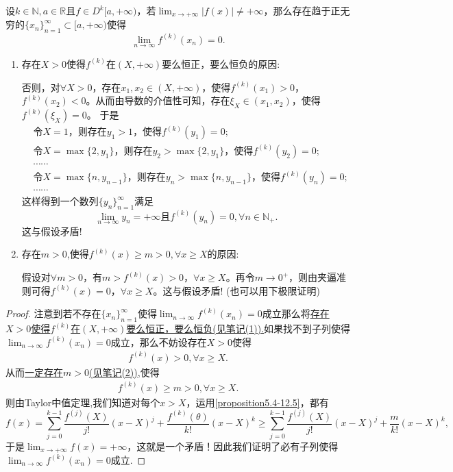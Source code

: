 \documentclass[lang=cn,newtx,10pt,scheme=chinese]{elegantbook}
\begin{document}
\begin{proposition}\label{proposition:函数不爆破则各阶导数必然有趋于 0 的子列}
设\(k\in\mathbb{N},a\in\mathbb{R}\)且\(f\in D^{k}[a,+\infty)\)，若\(\lim_{x\rightarrow +\infty}|f(x)|\neq +\infty\)，那么存在趋于正无穷的\(\{x_n\}_{n = 1}^{\infty}\subset [a,+\infty)\)使得
\[
\lim_{n\rightarrow\infty}f^{(k)}(x_n)=0.
\]
\end{proposition}
\begin{note}
\begin{enumerate}[(1)]
\item \hypertarget{proposition5.4由假设得到这个结论的原因}{存在\(X > 0\)使得\(f^{(k)}\)在\((X,+\infty)\)要么恒正，要么恒负的原因:}否则，对\(\forall X>0\)，存在\(x_1,x_2\in (X,+\infty)\)，使得\(f^{(k)}(x_1)>0\)，\(f^{(k)}(x_2)<0\)。从而由导数的介值性可知，存在\(\xi_X\in (x_1,x_2)\)，使得\(f^{(k)}(\xi_X) = 0\)。
于是
\begin{align*}
&\text{令}X = 1\text{，则存在}y_1>1\text{，使得}f^{(k)}(y_1)=0;\\
&\text{令}X=\max\{2,y_1\}\text{，则存在}y_2>\max\{2,y_1\}\text{，使得}f^{(k)}(y_2)=0;\\
&\cdots\cdots\\
&\text{令}X=\max\{n,y_{n - 1}\}\text{，则存在}y_n>\max\{n,y_{n - 1}\}\text{，使得}f^{(k)}(y_n)=0;\\
&\cdots\cdots
\end{align*}
这样得到一个数列\(\{y_n\}_{n = 1}^{\infty}\)满足
\[
\lim_{n\rightarrow \infty}y_n=+\infty\text{且}f^{(k)}(y_n)=0,\forall n\in \mathbb{N}_+.
\]
这与假设矛盾!

\item \hypertarget{m的存在性}{存在$m>0$,使得$f^{(k)}(x)\geqslant m>0,\forall x\geqslant X$的原因:}假设对\(\forall m>0\)，有\(m > f^{(k)}(x) > 0\)，\(\forall x\geqslant X\)。再令\(m\rightarrow 0^+\)，则由夹逼准则可得\(f^{(k)}(x) = 0\)，\(\forall x\geqslant X\)。这与假设矛盾!
(也可以用下极限证明)
\end{enumerate}
\end{note}
\begin{proof}
注意到若不存在\(\{x_n\}_{n = 1}^{\infty}\)使得\(\lim_{n\rightarrow\infty}f^{(k)}(x_n)=0\)成立那么将\hyperlink{proposition5.4由假设得到这个结论的原因}{存在\(X > 0\)使得\(f^{(k)}\)在\((X,+\infty)\)要么恒正，要么恒负(见笔记(1)).}如果找不到子列使得\(\lim_{n\rightarrow\infty}f^{(k)}(x_n)=0\)成立，那么不妨设存在\(X> 0\)使得
\begin{align*}
f^{(k)}(x)>0,\forall x\geqslant X.
\end{align*}
从而\hyperlink{m的存在性}{一定存在$m>0$(见笔记(2))},使得
\begin{align}\label{proposition5.4-12.5}
f^{(k)}(x)\geqslant m>0,\forall x\geqslant X.
\end{align}
则由Taylor中值定理,我们知道对每个\(x > X\)，运用\eqref{proposition5.4-12.5}，都有
\[f(x)=\sum_{j = 0}^{k - 1}\frac{f^{(j)}(X)}{j!}(x - X)^j+\frac{f^{(k)}(\theta)}{k!}(x - X)^k\geqslant\sum_{j = 0}^{k - 1}\frac{f^{(j)}(X)}{j!}(x - X)^j+\frac{m}{k!}(x - X)^k,\]
于是\(\lim_{x\rightarrow +\infty}f(x)=+\infty\)，这就是一个矛盾！因此我们证明了必有子列使得\(\lim_{n\rightarrow\infty}f^{(k)}(x_n)=0\)成立.
\end{proof}
\end{document}
